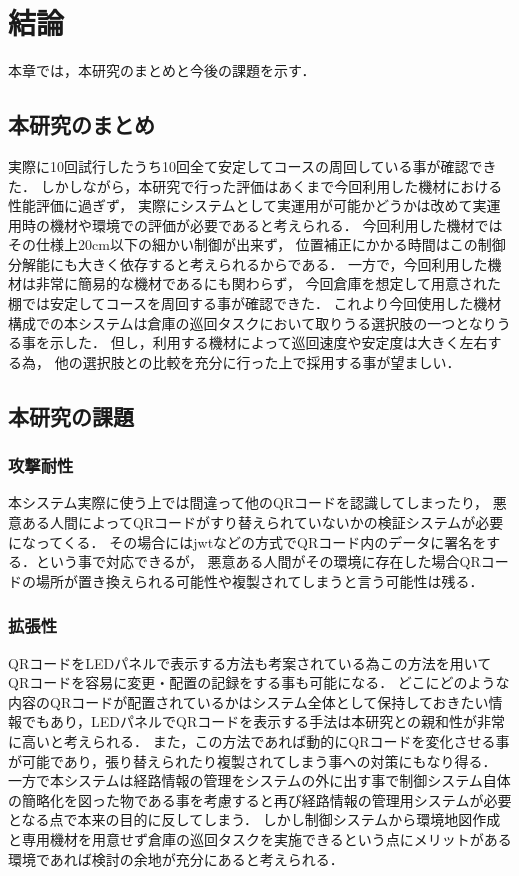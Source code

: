 \chapter{結論}
\label{conclusion}

本章では，本研究のまとめと今後の課題を示す．

\section{本研究のまとめ}
実際に10回試行したうち10回全て安定してコースの周回している事が確認できた．
しかしながら，本研究で行った評価はあくまで今回利用した機材における性能評価に過ぎず，
実際にシステムとして実運用が可能かどうかは改めて実運用時の機材や環境での評価が必要であると考えられる．
今回利用した機材ではその仕様上20cm以下の細かい制御が出来ず，
位置補正にかかる時間はこの制御分解能にも大きく依存すると考えられるからである．
一方で，今回利用した機材は非常に簡易的な機材であるにも関わらず，
今回倉庫を想定して用意された棚では安定してコースを周回する事が確認できた．
これより今回使用した機材構成での本システムは倉庫の巡回タスクにおいて取りうる選択肢の一つとなりうる事を示した．
但し，利用する機材によって巡回速度や安定度は大きく左右する為，
他の選択肢との比較を充分に行った上で採用する事が望ましい．


\section{本研究の課題}
\subsection{攻撃耐性}
本システム実際に使う上では間違って他のQRコードを認識してしまったり，
悪意ある人間によってQRコードがすり替えられていないかの検証システムが必要になってくる．
その場合にはjwtなどの方式でQRコード内のデータに署名をする．という事で対応できるが，
悪意ある人間がその環境に存在した場合QRコードの場所が置き換えられる可能性や複製されてしまうと言う可能性は残る．

\subsection{拡張性}
QRコードをLEDパネルで表示する方法\cite{led_qr}も考案されている為この方法を用いてQRコードを容易に変更・配置の記録をする事も可能になる．
どこにどのような内容のQRコードが配置されているかはシステム全体として保持しておきたい情報でもあり，LEDパネルでQRコードを表示する手法は本研究との親和性が非常に高いと考えられる．
また，この方法であれば動的にQRコードを変化させる事が可能であり，張り替えられたり複製されてしまう事への対策にもなり得る．
一方で本システムは経路情報の管理をシステムの外に出す事で制御システム自体の簡略化を図った物である事を考慮すると再び経路情報の管理用システムが必要となる点で本来の目的に反してしまう．
しかし制御システムから環境地図作成と専用機材を用意せず倉庫の巡回タスクを実施できるという点にメリットがある環境であれば検討の余地が充分にあると考えられる．


